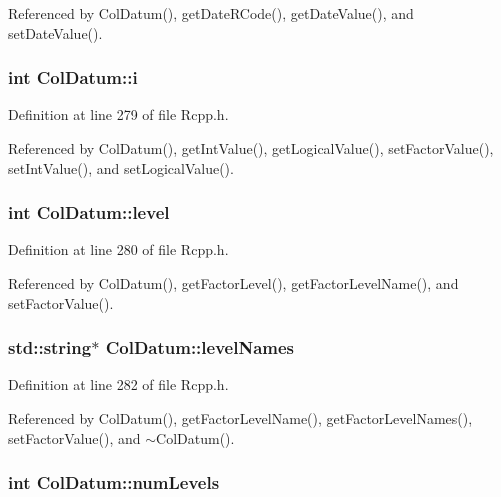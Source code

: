 Referenced by ColDatum(), getDateRCode(), getDateValue(), and setDateValue().\hypertarget{classColDatum_4ceff4204e29f345957cb5544f40104f}{
\subsubsection[{i}]{\setlength{\rightskip}{0pt plus 5cm}int {\bf ColDatum::i}}}
\label{classColDatum_4ceff4204e29f345957cb5544f40104f}




Definition at line 279 of file Rcpp.h.

Referenced by ColDatum(), getIntValue(), getLogicalValue(), setFactorValue(), setIntValue(), and setLogicalValue().\hypertarget{classColDatum_7b0fc92a094e9d1a865fd84c939170d0}{
\subsubsection[{level}]{\setlength{\rightskip}{0pt plus 5cm}int {\bf ColDatum::level}}}
\label{classColDatum_7b0fc92a094e9d1a865fd84c939170d0}




Definition at line 280 of file Rcpp.h.

Referenced by ColDatum(), getFactorLevel(), getFactorLevelName(), and setFactorValue().\hypertarget{classColDatum_2abac3c574e1ab36531b03849197f779}{
\subsubsection[{levelNames}]{\setlength{\rightskip}{0pt plus 5cm}std::string$\ast$ {\bf ColDatum::levelNames}}}
\label{classColDatum_2abac3c574e1ab36531b03849197f779}




Definition at line 282 of file Rcpp.h.

Referenced by ColDatum(), getFactorLevelName(), getFactorLevelNames(), setFactorValue(), and $\sim$ColDatum().\hypertarget{classColDatum_42954a262993eee014db2d1fd7a7c34f}{
\subsubsection[{numLevels}]{\setlength{\rightskip}{0pt plus 5cm}int {\bf ColDatum::numLevels}}}
\label{classColDatum_42954a262993eee014db2d1fd7a7c34f}




